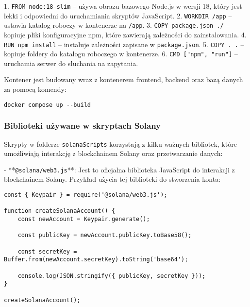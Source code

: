 1. \texttt{FROM node:18-slim} – używa obrazu bazowego Node.js w wersji 18, który jest lekki i odpowiedni do uruchamiania skryptów JavaScript.
2. \texttt{WORKDIR /app} – ustawia katalog roboczy w kontenerze na \texttt{/app}.
3. \texttt{COPY package.json ./} – kopiuje pliki konfiguracyjne npm, które zawierają zależności do zainstalowania.
4. \texttt{RUN npm install} – instaluje zależności zapisane w \texttt{package.json}.
5. \texttt{COPY . .} – kopiuje foldery do katalogu roboczego w kontenerze.
6. \texttt{CMD ["npm", "run"]} – uruchamia serwer do słuchania na zapytania.

Kontener jest budowany wraz z kontenerem frontend, backend oraz bazą danych za pomocą komendy:

\begin{lstlisting}
docker compose up --build
\end{lstlisting}

\subsubsection{Biblioteki używane w skryptach Solany}

Skrypty w folderze \texttt{solanaScripts} korzystają z kilku ważnych bibliotek, które umożliwiają interakcję z blockchainem Solany oraz przetwarzanie danych:

- **\texttt{@solana/web3.js}**: Jest to oficjalna biblioteka JavaScript do interakcji z blockchainem Solany.  
  Przykład użycia tej biblioteki do stworzenia konta:
  \begin{lstlisting}
const { Keypair } = require('@solana/web3.js');

function createSolanaAccount() {
    const newAccount = Keypair.generate();

    const publicKey = newAccount.publicKey.toBase58();

    const secretKey = Buffer.from(newAccount.secretKey).toString('base64');

    console.log(JSON.stringify({ publicKey, secretKey }));
}

createSolanaAccount();
  \end{lstlisting}